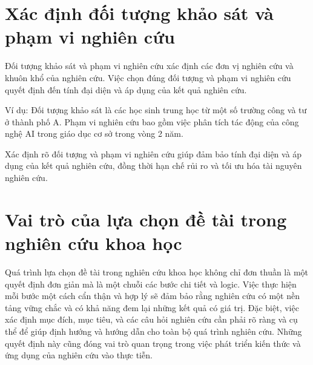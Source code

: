 \section{Xác định đối tượng khảo sát và phạm vi nghiên cứu}

Đối tượng khảo sát và phạm vi nghiên cứu xác định các đơn vị nghiên cứu và khuôn khổ của nghiên cứu. Việc chọn đúng đối tượng và phạm vi nghiên cứu quyết định đến tính đại diện và áp dụng của kết quả nghiên cứu. 

Ví dụ: Đối tượng khảo sát là các học sinh trung học từ một số trường công và tư ở thành phố A. Phạm vi nghiên cứu bao gồm việc phân tích tác động của công nghệ AI trong giáo dục cơ sở trong vòng 2 năm.

Xác định rõ đối tượng và phạm vi nghiên cứu giúp đảm bảo tính đại diện và áp dụng của kết quả nghiên cứu, đồng thời hạn chế rủi ro và tối ưu hóa tài nguyên nghiên cứu.

\section{Vai trò của lựa chọn đề tài trong nghiên cứu khoa học}

Quá trình lựa chọn đề tài trong nghiên cứu khoa học không chỉ đơn thuần là một quyết định đơn giản mà là một chuỗi các bước chi tiết và logic. Việc thực hiện mỗi bước một cách cẩn thận và hợp lý sẽ đảm bảo rằng nghiên cứu có một nền tảng vững chắc và có khả năng đem lại những kết quả có giá trị. Đặc biệt, việc xác định mục đích, mục tiêu, và các câu hỏi nghiên cứu cần phải rõ ràng và cụ thể để giúp định hướng và hướng dẫn cho toàn bộ quá trình nghiên cứu. Những quyết định này cũng đóng vai trò quan trọng trong việc phát triển kiến thức và ứng dụng của nghiên cứu vào thực tiễn.
